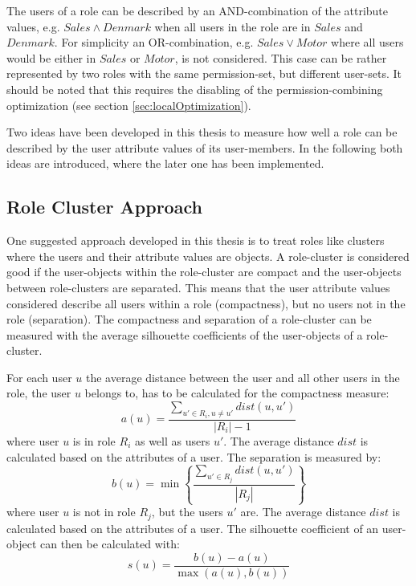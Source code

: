     The users of a role can be described by an AND-combination of the attribute values, e.g. $Sales \wedge Denmark$ when all users in the role are in $Sales$ and $Denmark$. For simplicity an OR-combination, e.g. $Sales \vee Motor$ where all users would be either in $Sales$ or $Motor$, is not considered. This case can be rather represented by two roles with the same permission-set, but different user-sets. It should be noted that this requires the disabling of the permission-combining optimization (see section \ref{sec:localOptimization}).
    
    \iffalse
    A similar approach is followed in Xu \& Stoller\cite{Xu}, but they calculate an attribute mismatch of roles, which does not consider the heterogeneity of users in different roles as well as homogeneity of users in the same role. In the following sections two approaches are discussed theoretically and one of the approaches is implemented.
    
    \fi
    Two ideas have been developed in this thesis to measure how well a role can be described by the user attribute values of its user-members. In the following both ideas are introduced, where the later one has been implemented.
    
        \subsection{Role Cluster Approach}
        One suggested approach developed in this thesis is to treat roles like clusters where the users and their attribute values are objects. A role-cluster is considered good if the user-objects within the role-cluster are compact and the user-objects between role-clusters are separated. This means that the user attribute values considered describe all users within a role (compactness), but no users not in the role (separation). The compactness and separation of a role-cluster can be measured with the average silhouette coefficients of the user-objects of a role-cluster\cite{Han}. 
        
        For each user $u$ the average distance between the user and all other users in the role, the user $u$ belongs to, has to be calculated for the compactness measure:
        \begin{equation}\label{eq:compactness}
	        a(u) = \frac{\sum_{u' \in R_i, u \neq u'}dist(u,u')}{|R_i|-1}
        \end{equation}
        where user $u$ is in role $R_i$ as well as users $u'$. The average distance $dist$ is calculated based on the attributes of a user. The separation is measured by:
        \begin{equation}\label{eq:separartion}
        b(u) = \min \left\{{\frac{\sum_{u' \in R_j}dist(u,u')}{|R_j|}}\right\}
        \end{equation}
        where user $u$ is not in role $R_j$, but the users $u'$ are. The average distance $dist$ is calculated based on the attributes of a user. The silhouette coefficient of an user-object can then be calculated with:
        \begin{equation}\label{eq:silhouette}
        s(u) = \frac{b(u) - a(u)}{\max(a(u),b(u))}
        \end{equation}
        
